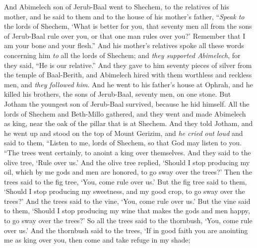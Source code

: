 \begin{biblechapter} %
 And Abimelech son of Jerub-Baal went to Shechem, to the relatives of his mother, and he said to them and to the house of his mother’s father,
\verse “\textit{Speak to} the lords of Shechem, ‘What is better for you, that seventy men all from the sons of Jerub-Baal rule over you, or that one man rules over you?’ Remember that I am your bone and your flesh.”
\verse And his mother’s relatives spoke all these words concerning him \textit{to} all the lords of Shechem; and \textit{they supported Abimelech}, for they said, “He is our relative.”
\verse And they gave to him seventy pieces of silver from the temple of Baal-Berith, and Abimelech hired with them worthless and reckless men, and \textit{they followed him}.
\verse And he went to his father’s house at Ophrah, and he killed his brothers, the sons of Jerub-Baal, seventy men, on one stone. But Jotham the youngest son of Jerub-Baal survived, because he hid himself.
\verse All the lords of Shechem and Beth-Millo gathered, and they went and made Abimelech as king, near the oak of the pillar that is at Shechem.
\verse And they told Jotham, and he went up and stood on the top of Mount Gerizim, and \textit{he cried out loud} and said to them, “Listen to me, lords of Shechem, so that God may listen to you.
\verse “The trees went certainly, 
to anoint a king over themselves. 
And they said to the olive tree, 
‘Rule over us.’
\verse And the olive tree replied, 
‘Should I stop producing my oil, 
which by me gods and men are honored, 
to go sway over the trees?’
\verse Then the trees said to the fig tree, 
‘You, come rule over us.’
\verse But the fig tree said to them, 
‘Should I stop producing my sweetness, 
and my good crop, 
to go sway over the trees?’
\verse And the trees said to the vine, 
‘You, come rule over us.’
\verse But the vine said to them, 
‘Should I stop producing my wine 
that makes the gods and men happy, 
to go sway over the trees?’
\verse So all the trees said to the thornbush, 
‘You, come rule over us.’
\verse And the thornbush said to the trees, 
‘If in good faith you are anointing 
me as king over you, 
then come and take refuge in my shade; 

\end{biblechapter}
